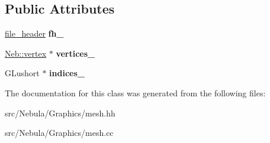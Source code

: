 \subsection*{Public Attributes}
\begin{DoxyCompactItemize}
\item 
\hypertarget{classNeb_1_1mesh_ac14d8e128fa08a0af6ee94ac8ead51fe}{\hyperlink{structNeb_1_1file__header}{file\-\_\-header} {\bfseries fh\-\_\-}}\label{classNeb_1_1mesh_ac14d8e128fa08a0af6ee94ac8ead51fe}

\item 
\hypertarget{classNeb_1_1mesh_aefde5a8aa00acae79b9200a6586b5516}{\hyperlink{structNeb_1_1vertex}{Neb\-::vertex} $\ast$ {\bfseries vertices\-\_\-}}\label{classNeb_1_1mesh_aefde5a8aa00acae79b9200a6586b5516}

\item 
\hypertarget{classNeb_1_1mesh_a797d7464a3d8c5735ed41e244e1de533}{G\-Lushort $\ast$ {\bfseries indices\-\_\-}}\label{classNeb_1_1mesh_a797d7464a3d8c5735ed41e244e1de533}

\end{DoxyCompactItemize}


The documentation for this class was generated from the following files\-:\begin{DoxyCompactItemize}
\item 
src/\-Nebula/\-Graphics/mesh.\-hh\item 
src/\-Nebula/\-Graphics/mesh.\-cc\end{DoxyCompactItemize}
